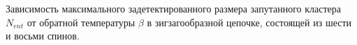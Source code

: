 Зависимость максимального задетектированного размера запутанного кластера~$N_{ent}$ от обратной температуры $\beta$
в зигзагообразной цепочке,
состоящей из шести и восьми спинов.